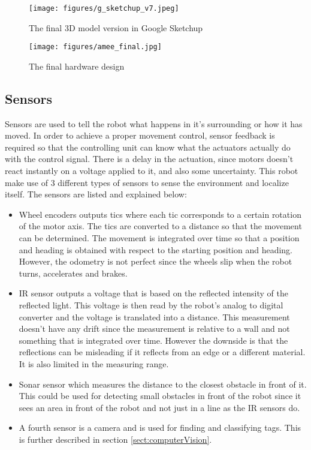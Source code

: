 \begin{figure}[h!]
\label{fig:google_sketchup_draw1}
    \begin{centering}
   	 \texttt{[image: figures/g\_sketchup\_v7.jpeg]}
   	 \caption{The final 3D model version in Google Sketchup}\label{fig:google_sketchup_draw1}
    \end{centering}
\end{figure}


\begin{figure}[h!]
\label{fig:amee_final}
    \begin{centering}
   	 \texttt{[image: figures/amee\_final.jpg]}
   	 \caption{The final hardware design}\label{fig:amee_final}
    \end{centering}
\end{figure}

\subsection{Sensors}

Sensors are used to tell the robot what happens in it's surrounding or how it has moved. 
In order to achieve a proper movement control, sensor feedback is required so that the controlling unit can know what the actuators actually do with the control signal. There is a delay in the actuation, since motors doesn't react instantly on a voltage applied to it, and also some uncertainty. This robot make use of 3 different types of sensors to sense the environment and localize itself. The sensors are listed and explained below:
\begin{itemize}
\item Wheel encoders outputs tics where each tic corresponds to a certain rotation of the motor axis. The tics are converted to a distance so that the movement can be determined. The movement is integrated over time so that a position and heading is obtained with respect to the starting position and heading. However, the odometry is not perfect since the wheels slip when the robot turns, accelerates and brakes. 

\item IR sensor outputs a voltage that is based on the reflected intensity of the reflected light. This voltage is then read by the robot's analog to digital converter and the voltage is translated into a distance. This measurement doesn't have any drift since the measurement is relative to a wall and not something that is integrated over time. However the downside is that the reflections can be misleading if it reflects from an edge or a different material. It is also limited in the measuring range.

\item Sonar sensor which measures the distance to the closest obstacle in front of it. This could be used for detecting small obstacles in front of the robot since it sees an area in front of the robot and not just in a line as the IR sensors do.

\item A fourth sensor is a camera and is used for finding and classifying tags. This is further described in section \ref{sect:computerVision}.

\end{itemize}